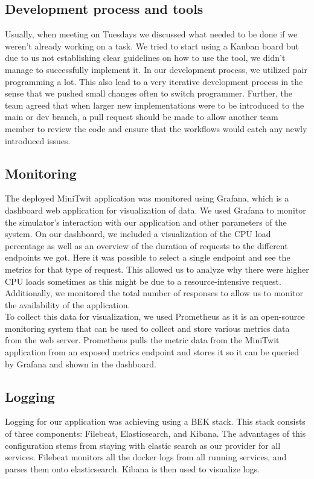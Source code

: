 \subsection{Development process and tools}
Usually, when meeting on Tuesdays we discussed what needed to be done if we weren't already working on a task. We tried to start using a Kanban board but due to us not establishing 
clear guidelines on how to use the tool, we didn't manage to successfully implement it. In our development process, we utilized pair programming a lot. This also lead to a very iterative development 
process in the sense that we pushed small changes often to switch programmer. Further, the team agreed that when larger new implementations were to be introduced
to the main or dev branch, a pull request should be made to allow another team member to review the code and ensure that the workflows would catch any newly
introduced issues. 

\subsection{Monitoring}
The deployed MiniTwit application was monitored using Grafana, which is a dashboard web application for visualization of data. 
We used Grafana to monitor the simulator's interaction with our application and other parameters of the system. On our dashboard, 
we included a visualization of the CPU load percentage as well as an overview of the duration of requests to the different endpoints  
we got. Here it was possible to select a single endpoint and see the metrics for that type of request. This allowed us to analyze why 
there were higher CPU loads sometimes as this might be due to a resource-intensive request. Additionally, we monitored the total number of
responses to allow us to monitor the availability of the application. \\

To collect this data for visualization, we used Prometheus as it is an open-source monitoring system that can be used to collect 
and store various metrics data from the web server. Prometheus pulls the metric data from the MiniTwit application from an exposed metrics endpoint
and stores it so it can be queried by Grafana and shown in the dashboard.  

\subsection{Logging}
Logging for our application was achieving using a BEK stack. This stack consists of three components: Filebeat, Elasticsearch, and Kibana.
The advantages of this configuration stems from staying with elastic search as our provider for all services. Filebeat monitors all the docker logs from all running services,
and parses them onto elasticsearch. Kibana is then used to visualize logs. 

